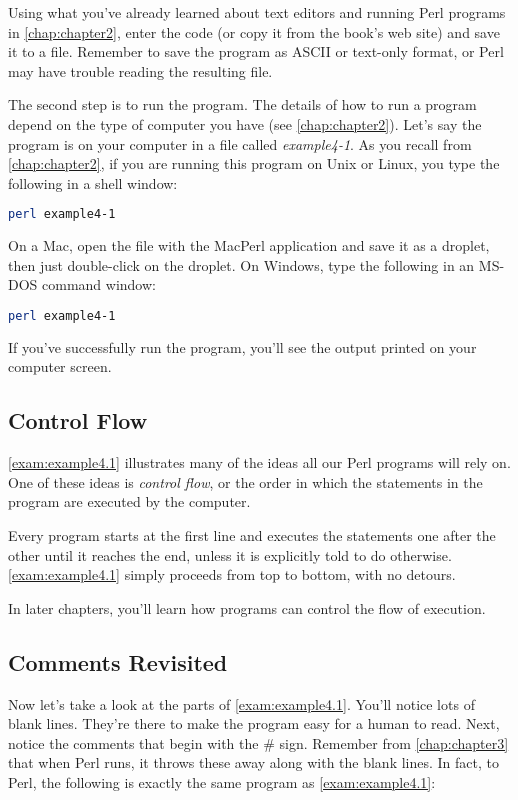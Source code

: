 Using what you've already learned about text editors and running Perl programs in \autoref{chap:chapter2}, enter the code (or copy it from the book's web site) and save it to a file. Remember to save the program as ASCII or text-only format, or Perl may have trouble reading the resulting file.

The second step is to run the program. The details of how to run a program depend on the type of computer you have (see \autoref{chap:chapter2}). Let's say the program is on your computer in a file called \textit{example4-1}. As you recall from \autoref{chap:chapter2}, if you are running this program on Unix or Linux, you type the following in a shell window:

\begin{lstlisting}[language=bash]
perl example4-1
\end{lstlisting}

On a Mac, open the file with the MacPerl application and save it as a droplet, then just double-click on the droplet. On Windows, type the following in an MS-DOS command window: 

\begin{lstlisting}[language=bash]
perl example4-1
\end{lstlisting}

If you've successfully run the program, you'll see the output printed on your computer screen. 

\subsection{Control Flow}
\autoref{exam:example4.1} illustrates many of the ideas all our Perl programs will rely on. One of these ideas is \textit{control flow}, or the order in which the statements in the program are executed by the computer.

Every program starts at the first line and executes the statements one after the other until it reaches the end, unless it is explicitly told to do otherwise. \autoref{exam:example4.1} simply proceeds from top to bottom, with no detours.

In later chapters, you'll learn how programs can control the flow of execution. 

\subsection{Comments Revisited}
Now let's take a look at the parts of \autoref{exam:example4.1}. You'll notice lots of blank lines. They're there to make the program easy for a human to read. Next, notice the comments that begin with the \# sign. Remember from \autoref{chap:chapter3} that when Perl runs, it throws these away along with the blank lines. In fact, to Perl, the following is exactly the same program as \autoref{exam:example4.1}: 

